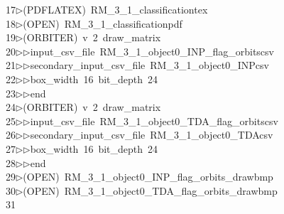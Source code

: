\begin{tabbing}
17\>$\triangleright$\>(PDFLATEX)\ RM\_3\_1\_classificationtex\\[0pt]
18\>$\triangleright$\>(OPEN)\ RM\_3\_1\_classificationpdf\\[0pt]
19\>$\triangleright$\>(ORBITER)\ v\ 2\ draw\_matrix\ \\[0pt]
20\>$\triangleright$\>$\triangleright$\>input\_csv\_file\ RM\_3\_1\_object0\_INP\_flag\_orbitscsv\ \\[0pt]
21\>$\triangleright$\>$\triangleright$\>secondary\_input\_csv\_file\ RM\_3\_1\_object0\_INPcsv\ \\[0pt]
22\>$\triangleright$\>$\triangleright$\>box\_width\ 16\ bit\_depth\ 24\ \\[0pt]
23\>$\triangleright$\>$\triangleright$\>end\\[0pt]
24\>$\triangleright$\>(ORBITER)\ v\ 2\ draw\_matrix\ \\[0pt]
25\>$\triangleright$\>$\triangleright$\>input\_csv\_file\ RM\_3\_1\_object0\_TDA\_flag\_orbitscsv\ \\[0pt]
26\>$\triangleright$\>$\triangleright$\>secondary\_input\_csv\_file\ RM\_3\_1\_object0\_TDAcsv\ \\[0pt]
27\>$\triangleright$\>$\triangleright$\>box\_width\ 16\ bit\_depth\ 24\ \\[0pt]
28\>$\triangleright$\>$\triangleright$\>end\\[0pt]
29\>$\triangleright$\>(OPEN)\ RM\_3\_1\_object0\_INP\_flag\_orbits\_drawbmp\\[0pt]
30\>$\triangleright$\>(OPEN)\ RM\_3\_1\_object0\_TDA\_flag\_orbits\_drawbmp\\[0pt]
31\>\end{tabbing}

